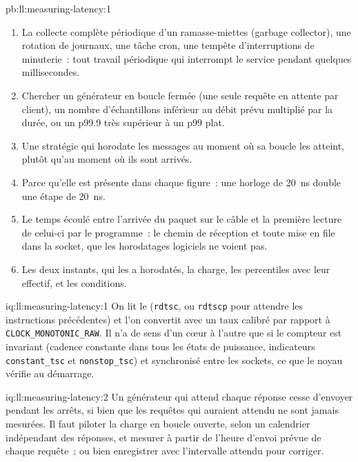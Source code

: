 \begin{solution}{pb:ll:measuring-latency:1}
\begin{enumerate}
seconde pendant 100 secondes. Histogramme~: log-linéaire, précision de 0.8~\%, 100\,000 échantillons~; p50 \qty{0.10}{\milli\second}, p99
\qty{1.87}{\milli\second}, p99.9 \qty{10.1}{\milli\second}. Il faut ajouter la machine, le placement, les versions, l'horloge et les répétitions.
\item La collecte complète périodique d'un ramasse-miettes (garbage collector), une rotation de journaux, une tâche cron, une tempête d'interruptions de minuterie~: tout travail périodique
qui interrompt le service pendant quelques millisecondes.
\item Chercher un générateur en boucle fermée (une seule requête en attente par client), un nombre d'échantillons inférieur au débit prévu multiplié
par la durée, ou un p99.9 très supérieur à un p99 plat.
\item Une stratégie qui horodate les messages au moment où sa boucle les atteint, plutôt qu'au moment où ils sont arrivés.
\item Parce qu'elle est présente dans chaque figure~: une horloge de \qty{20}{\nano\second} double une étape de \qty{20}{\nano\second}.
\item Le temps écoulé entre l'arrivée du paquet sur le câble et la première lecture de celui-ci par le programme~: le chemin de réception et toute
mise en file dans la socket, que les horodatages logiciels ne voient pas.
\item Les deux instants, qui les a horodatés, la charge, les percentiles avec leur effectif, et les conditions.
\end{enumerate}
\end{solution}

\begin{solution}{iq:ll:measuring-latency:1}
On lit le  (\texttt{rdtsc}, ou \texttt{rdtscp} pour attendre les instructions précédentes) et l'on convertit avec un taux
calibré par rapport à \texttt{CLOCK\_MONOTONIC\_RAW}. Il n'a de sens d'un cœur à l'autre que si le compteur est invariant
(cadence constante dans tous les états de puissance, indicateurs \texttt{constant\_tsc} et \texttt{nonstop\_tsc}) et synchronisé entre
les sockets, ce que le noyau vérifie au démarrage.
\end{solution}

\begin{solution}{iq:ll:measuring-latency:2}
Un générateur qui attend chaque réponse cesse d'envoyer pendant les arrêts, si bien que les requêtes qui auraient attendu ne sont jamais
mesurées. Il faut piloter la charge en boucle ouverte, selon un calendrier indépendant des réponses, et mesurer à partir de l'heure d'envoi prévue de
chaque requête~; ou bien enregistrer avec l'intervalle attendu pour corriger.
\end{solution}

